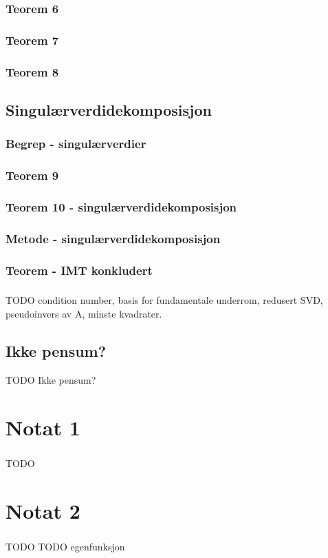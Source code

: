 \documentclass{article}
\begin{document}
      \subsubsection{Teorem 6}
        
      \subsubsection{Teorem 7}
        
      \subsubsection{Teorem 8}
        
    \subsection{Singulærverdidekomposisjon}
      \subsubsection{Begrep - singulærverdier}
        
      \subsubsection{Teorem 9}
        
      \subsubsection{Teorem 10 - singulærverdidekomposisjon}
        
      \subsubsection{Metode - singulærverdidekomposisjon}
        
      \subsubsection{Teorem - IMT konkludert}
        
      \subsubsection{}
        TODO condition number, basis for fundamentale underrom,
             redusert SVD, pseudoinvers av A, minste kvadrater.
    \subsection{Ikke pensum?}
      TODO Ikke pensum?
  \section{Notat 1}
    \subsubsection{}
      TODO
  \section{Notat 2}
    \subsubsection{}
      TODO
  TODO egenfunksjon
\end{document}
